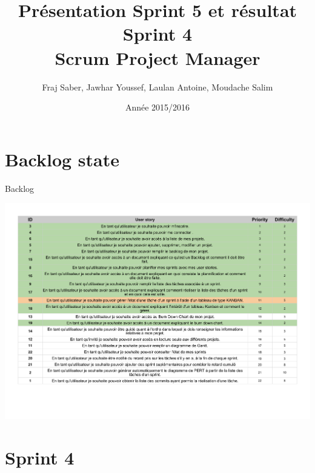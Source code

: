 \documentclass{beamer}
\title{}
\title{Présentation Sprint 5 et résultat Sprint 4 \\ Scrum Project Manager}
\author{Fraj Saber, Jawhar Youssef, Laulan Antoine, Moudache Salim}
\institute{Université de Bordeaux}
\date{Année 2015/2016}
\begin{document}


\begin{frame}
    \titlepage
\end{frame}

\section{Backlog state}

\begin{frame}{Backlog}
	\begin{center}
        \includegraphics[scale=0.4]{Backlog.pdf}
        \end{center}
\end{frame}

\section{Sprint 4}
\end{document}
